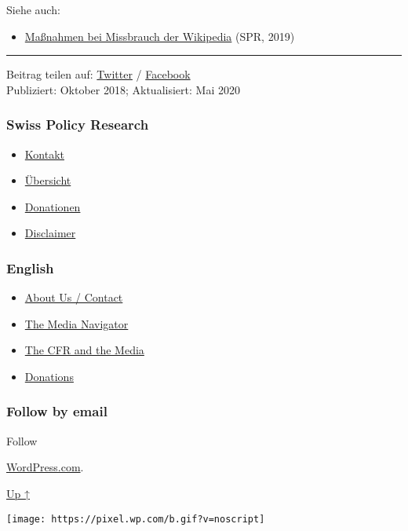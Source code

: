 Siehe auch:

\begin{itemize}
\tightlist
\item
  \href{https://swprs.org/wikipedia-missbrauch-massnahmen/}{Maßnahmen
  bei Missbrauch der Wikipedia} (SPR, 2019)
\end{itemize}

\begin{center}\rule{0.5\linewidth}{\linethickness}\end{center}

Beitrag teilen auf:
\href{https://twitter.com/intent/tweet?url=https://swprs.org/propaganda-in-der-wikipedia/}{Twitter}
/
\href{https://www.facebook.com/share.php?u=https://swprs.org/propaganda-in-der-wikipedia/}{Facebook}\\
Publiziert: Oktober 2018; Aktualisiert: Mai 2020

\hypertarget{swiss-policy-research}{%
\subsubsection{Swiss Policy Research}\label{swiss-policy-research}}

\begin{itemize}
\tightlist
\item
  \href{https://swprs.org/kontakt/}{Kontakt}
\item
  \href{https://swprs.org/uebersicht/}{Übersicht}
\item
  \href{https://swprs.org/donationen/}{Donationen}
\item
  \href{https://swprs.org/disclaimer/}{Disclaimer}
\end{itemize}

\hypertarget{english}{%
\subsubsection{English}\label{english}}

\begin{itemize}
\tightlist
\item
  \href{https://swprs.org/contact/}{About Us / Contact}
\item
  \href{https://swprs.org/media-navigator/}{The Media Navigator}
\item
  \href{https://swprs.org/the-american-empire-and-its-media/}{The CFR
  and the Media}
\item
  \href{https://swprs.org/donations/}{Donations}
\end{itemize}

\hypertarget{follow-by-email}{%
\subsubsection{Follow by email}\label{follow-by-email}}

Follow

\href{https://wordpress.com/?ref=footer_custom_com}{WordPress.com}.

\protect\hyperlink{}{Up ↑}

\texttt{[image: https://pixel.wp.com/b.gif?v=noscript]}
